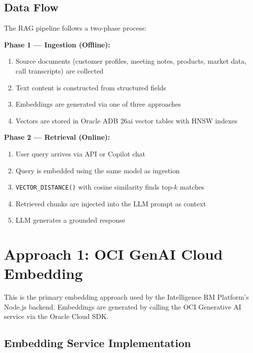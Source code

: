 \documentclass[12pt,a4paper]{article}
\begin{document}
\subsection{Data Flow}

The RAG pipeline follows a two-phase process:

\textbf{Phase 1 — Ingestion (Offline):}
\begin{enumerate}[label=\arabic*.]
  \item Source documents (customer profiles, meeting notes, products, market data, call transcripts) are collected
  \item Text content is constructed from structured fields
  \item Embeddings are generated via one of three approaches
  \item Vectors are stored in Oracle ADB 26ai vector tables with HNSW indexes
\end{enumerate}

\textbf{Phase 2 — Retrieval (Online):}
\begin{enumerate}[label=\arabic*.]
  \item User query arrives via API or Copilot chat
  \item Query is embedded using the same model as ingestion
  \item \texttt{VECTOR\_DISTANCE()} with cosine similarity finds top-$k$ matches
  \item Retrieved chunks are injected into the LLM prompt as context
  \item LLM generates a grounded response
\end{enumerate}

\section{Approach 1: OCI GenAI Cloud Embedding}
\label{sec:oci-genai}

This is the primary embedding approach used by the Intelligence RM Platform's Node.js backend. Embeddings are generated by calling the OCI Generative AI service via the Oracle Cloud SDK.

\subsection{Embedding Service Implementation}
\end{document}
